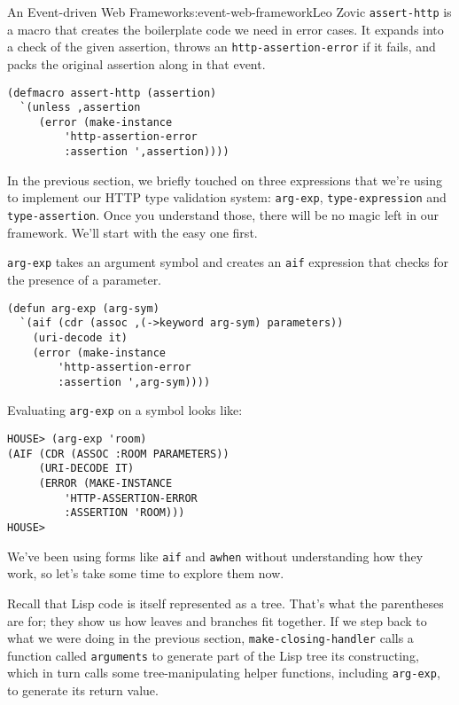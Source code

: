 \begin{aosachapter}{An Event-driven Web Framework}{s:event-web-framework}{Leo Zovic}
\texttt{assert-http} is a macro that creates the boilerplate code we
need in error cases. It expands into a check of the given assertion,
throws an \texttt{http-assertion-error} if it fails, and packs the
original assertion along in that event.

\begin{verbatim}
(defmacro assert-http (assertion)
  `(unless ,assertion
     (error (make-instance
         'http-assertion-error
         :assertion ',assertion))))
\end{verbatim}

\label{http-types}

\label{sec.eventsweb.types}

In the previous section, we briefly touched on three expressions that
we're using to implement our HTTP type validation system:
\texttt{arg-exp}, \texttt{type-expression} and \texttt{type-assertion}.
Once you understand those, there will be no magic left in our framework.
We'll start with the easy one first.

\label{arg-exp}

\texttt{arg-exp} takes an argument symbol and creates an \texttt{aif}
expression that checks for the presence of a parameter.

\begin{verbatim}
(defun arg-exp (arg-sym)
  `(aif (cdr (assoc ,(->keyword arg-sym) parameters))
    (uri-decode it)
    (error (make-instance
        'http-assertion-error
        :assertion ',arg-sym))))
\end{verbatim}

Evaluating \texttt{arg-exp} on a symbol looks like:

\begin{verbatim}
HOUSE> (arg-exp 'room)
(AIF (CDR (ASSOC :ROOM PARAMETERS))
     (URI-DECODE IT)
     (ERROR (MAKE-INSTANCE
         'HTTP-ASSERTION-ERROR
         :ASSERTION 'ROOM)))
HOUSE>
\end{verbatim}

We've been using forms like \texttt{aif} and \texttt{awhen} without
understanding how they work, so let's take some time to explore them
now.

Recall that Lisp code is itself represented as a tree. That's what the
parentheses are for; they show us how leaves and branches fit together.
If we step back to what we were doing in the previous section,
\texttt{make-closing-handler} calls a function called \texttt{arguments}
to generate part of the Lisp tree its constructing, which in turn calls
some tree-manipulating helper functions, including \texttt{arg-exp}, to
generate its return value.


\end{aosachapter}
